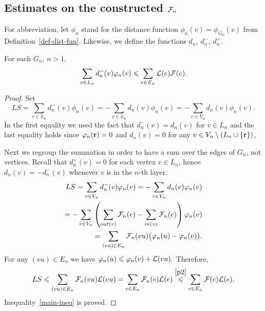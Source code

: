 \documentclass[12pt,oneside,a4paper]{amsart}
\begin{document}
        \medskip
        \subsection{Estimates on the constructed \texorpdfstring{$\mathcal{F}_{n}$}{Fn}}
          For abbreviation, let $\phi_n$ stand for the distance function $\phi_n(v) = \phi_{G_n}(v)$
            from Definition~\ref{def-dist-fun}.
          Likewise, we define the functions $d_n$, $d^{-}_n$, $d^{+}_n$.
          \begin{lemma}
            For each $G_n$, $n > 1$,
            \begin{equation}
              \label{main-ineq}
              \sum_{v\in L_n}d_{n}^{-}(v) \varphi_n(v) \leqslant \sum_{e \in E_n} \mathcal{L}(e) \mathcal{F}(e).
            \end{equation}
          \end{lemma}
          \begin{proof}
            Set
            \[
              LS = \sum_{v \in L_n} d_n^{-}(v) \phi_n(v) =
                  -\sum_{v \in L_n} d_n(v) \phi_n(v) =
                  -\sum_{v \in V_n} d_n(v) \phi_n(v).
            \]
            In the first equality we used the fact that $d_n^{-}(v) = d_n(v)$ for $v \in L_n$ and
              the last equality holds since $\varphi_n(\mathbf{r}) = 0$ and $d_n(v) = 0$
              for any $v \in V_{n} \setminus \left(L_n \cup \{\mathbf{r}\}\right)$,

            Next we regroup the summation in order to have a sum over the edges of $G_n$, not vertices.
            Recall that $d_n^{+}(v) = 0$ for each vertex $v \in L_n$,
              hence $d_n(v) = -d_n^{-}(v)$ whenever $v$ is in the $n$-th layer.
            \begin{align*}
              LS = \sum_{v \in V_n} d_n^{-}(v) \varphi_n(v) = -\sum\limits_{v \in V_n} d_n(v) \varphi_n(v)\\
              =-\sum_{v \in V_n} \left(\sum_{out(v)} \mathcal{F}_{n}(e) - \sum_{in(v)}\mathcal{F}_{n}(e) \right) \varphi_n(v)\\
              =\sum_{(vu) \in E_n} \mathcal{F}_{n}(vu) \big(\varphi_n(u) - \varphi_n(v)\big).
            \end{align*}
            For any $(vu) \in E_n$ we have $\varphi_n(u) \leqslant \varphi_n(v) + \mathcal{L}(vu).$
            Therefore,
            \[
              LS\leqslant\sum_{(vu) \in E_n} \mathcal{F}_{n}(vu) \mathcal{L}(vu)= \sum_{e \in E_n} \mathcal{F}_{n}(e) \mathcal{L}(e) \overset{\ref{p2}}{\leqslant} \sum_{e \in E_n} \mathcal{F}(e) \mathcal{L}(e).
            \]
            Inequality~\eqref{main-ineq} is proved.
          \end{proof}
\end{document}
